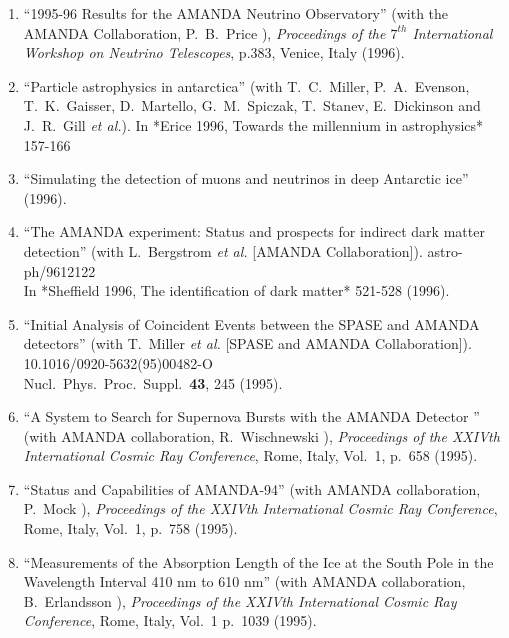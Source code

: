 \begin{enumerate}
\item ``1995-96 Results for the AMANDA Neutrino
        Observatory'' (with the   AMANDA Collaboration,
        P.~B.~Price \etal), {\it Proceedings of the
        $7^{th}$ International Workshop on Neutrino
        Telescopes}, p.383,   Venice, Italy (1996).

\item ``Particle astrophysics in antarctica'' (with
        T.~C.~Miller, P.~A.~Evenson, T.~K.~Gaisser,
        D.~Martello, G.~M.~Spiczak, T.~Stanev, E.~Dickinson
        and J.~R.~Gill {\it et al.}). In *Erice 1996,
        Towards the millennium in astrophysics* 157-166

\item ``Simulating the detection of muons and neutrinos in
        deep Antarctic ice'' (1996).

\item ``The AMANDA experiment: Status and prospects for
        indirect dark matter detection'' (with L.~Bergstrom
        {\it et al.}  [AMANDA Collaboration]).
        astro-ph/9612122 \\{}In *Sheffield 1996, The
        identification of dark matter* 521-528 %
        (1996).

\item ``Initial Analysis of Coincident Events between the
        SPASE and AMANDA detectors'' (with T.~Miller {\it et
        al.}  [SPASE and AMANDA Collaboration]).
        10.1016/0920-5632(95)00482-O \\{}Nucl.\ Phys.\
        Proc.\ Suppl.\  {\bf 43}, 245 (1995).

\item ``A System to Search for Supernova Bursts with the
        AMANDA Detector  '' (with AMANDA collaboration,
        R.~Wischnewski \etal), {\it Proceedings   of the
        XXIVth International Cosmic Ray Conference}, Rome,
        Italy,   Vol.~1, p.~658 (1995).

\item ``Status and Capabilities of AMANDA-94'' (with AMANDA
        collaboration,   P.~Mock \etal), {\it Proceedings of
        the XXIVth International Cosmic     Ray Conference},
        Rome, Italy, Vol.~1, p.~758 (1995).

\item ``Measurements of the Absorption Length of the Ice at
        the South   Pole in the Wavelength Interval 410 nm
        to 610 nm'' (with AMANDA   collaboration,
        B.~Erlandsson \etal), {\it Proceedings of the XXIVth
        International Cosmic Ray Conference}, Rome, Italy,
        Vol.~1 p.~1039 (1995).


\end{enumerate}
